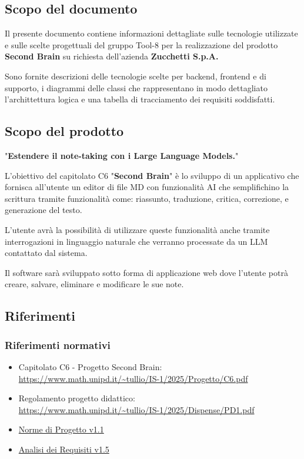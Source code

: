 \documentclass[a4paper,10pt]{article}
\begin{document}
\subsection{Scopo del documento}
Il presente documento contiene informazioni dettagliate sulle tecnologie utilizzate e sulle scelte progettuali del gruppo Tool-8 per la realizzazione del prodotto \textbf{Second Brain} su richiesta dell'azienda \textbf{Zucchetti S.p.A.}

Sono fornite descrizioni delle tecnologie scelte per backend, frontend e di supporto, i diagrammi delle classi che rappresentano in modo dettagliato l'archittettura logica e una tabella di tracciamento dei requisiti soddisfatti.

\subsection{Scopo del prodotto}
"\textbf{Estendere il note-taking con i Large Language Models.}"

L'obiettivo del capitolato C6 "\textbf{Second Brain}" è lo sviluppo di un applicativo che fornisca all'utente un editor di file MD con funzionalità AI che semplifichino la scrittura tramite funzionalità come: riassunto, traduzione, critica, correzione, e generazione del testo.

L'utente avrà la possibilità di utilizzare queste funzionalità anche tramite interrogazioni in linguaggio naturale che verranno processate da un LLM contattato dal sistema.

Il software sarà sviluppato sotto forma di applicazione web dove l'utente potrà creare, salvare, eliminare e modificare le sue note.

\subsection{Riferimenti}
\subsubsection{Riferimenti normativi}
\begin{itemize}
  \item Capitolato C6 - Progetto Second Brain: \\  \url{https://www.math.unipd.it/~tullio/IS-1/2025/Progetto/C6.pdf}
  \item Regolamento progetto didattico: \\ \url{https://www.math.unipd.it/~tullio/IS-1/2025/Dispense/PD1.pdf}
  \item \href{https://tool-8.github.io/Documentazione-SWE/pb/Norme_di_Progetto_v1.1.pdf}{Norme di Progetto v1.1}
  \item \href{https://tool-8.github.io/Documentazione-SWE/pb/Analisi_dei_Requisiti_v1.5.pdf}{Analisi dei Requisiti v1.5}
\end{itemize}
\end{document}
